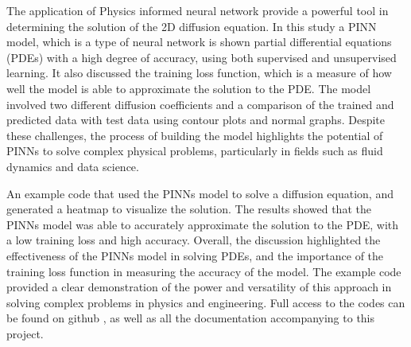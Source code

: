 The application of Physics informed neural network provide a powerful tool in determining the solution of the 2D  diffusion equation. In this study a PINN model, which is a type of neural network is shown  partial differential equations (PDEs) with a high degree of accuracy, using both supervised and unsupervised learning. It also discussed the training loss function, which is a measure of how well the model is able to approximate the solution to the PDE. The model involved two different diffusion coefficients and a comparison of the trained and predicted data with test data using contour plots and normal graphs. Despite these challenges, the process of building the model highlights the potential of PINNs to solve complex physical problems, particularly in fields such as fluid dynamics and data science. 

An example code that used the PINNs model to solve a diffusion equation, and generated a heatmap to visualize the solution. The results showed that the PINNs model was able to accurately approximate the solution to the PDE, with a low training loss and high accuracy. Overall, the discussion highlighted the effectiveness of the PINNs model in solving PDEs, and the importance of the training loss function in measuring the accuracy of the model. The example code provided a clear demonstration of the power and versatility of this approach in solving complex problems in physics and engineering. Full access to the codes can be found on github \cite{Eyob2023_Git}, as well as all the documentation accompanying to this project.